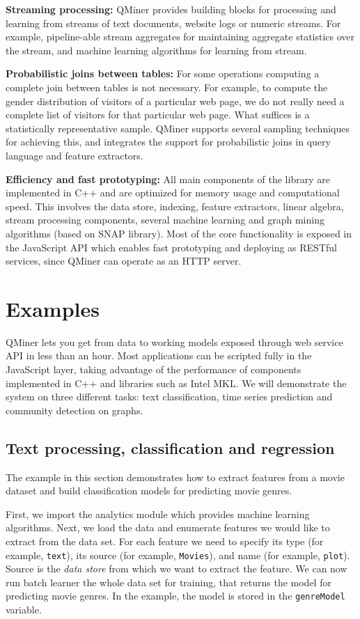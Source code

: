 \documentclass{article} %
\begin{document}
\textbf{Streaming processing:} QMiner provides building blocks for processing and learning from streams of text documents, website logs or numeric streams. For example, pipeline-able stream aggregates for maintaining aggregate statistics over the stream, and machine learning algorithms for learning from stream.

\textbf{Probabilistic joins between tables:} For some operations computing a complete join between tables is not necessary. For example, to compute the gender distribution of visitors of a particular web page, we do not really need a complete list of visitors for that particular web page. What suffices is a statistically representative sample. QMiner supports several sampling techniques for achieving this, and integrates the support for probabilistic joins in query language and feature extractors.

\textbf{Efficiency and fast prototyping:} All main components of the library are implemented in C++ and are optimized for memory usage and computational speed. This involves the data store, indexing, feature extractors, linear algebra, stream processing components, several machine learning and graph mining algorithms (based on SNAP library). Most of the core functionality is exposed in the JavaScript API which enables fast prototyping and deploying as RESTful services, since QMiner can operate as an HTTP server.


\section{Examples}

QMiner lets you get from data to working models exposed through web service API in less than an hour. Most applications can be scripted fully in the JavaScript layer, taking advantage of the performance of components implemented in C++ and libraries such as Intel MKL. We will demonstrate the system on three different tasks: text classification, time series prediction and community detection on graphs.

\subsection{Text processing, classification and regression}

The example in this section demonstrates how to extract features from a movie dataset and build classification models for predicting movie genres.

First, we import the analytics module which provides machine learning algorithms. Next, we load the data and enumerate features we would like to extract from the data set. For each feature we need to specify its type (for example, \texttt{text}), its source (for example, \texttt{Movies}), and name (for example, \texttt{plot}). Source is the \emph{data store} from which we want to extract the feature. We can now run batch learner the whole data set for training, that returns the model for predicting movie genres. In the example, the model is stored in the \texttt{genreModel} variable.
\end{document}
